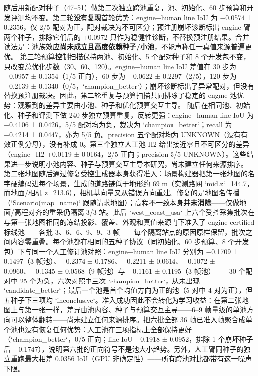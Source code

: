 \documentclass[journal]{IEEEtran}
\begin{document}
随后用新配对种子（47--51）做第二次独立跨池重复，池、初始化、60 步预算和开发评测均不变。第二轮\textbf{没有复现}首轮优势：engine−human line IoU 为 −0.0574 ± 0.2356，仅 2/5 配对为正，配对裁决为不可区分；预注册崩坏诊断标出 engine 臂两个种子，排除它们后的 +0.0972 只作为稳健性诊断，不替换预注册结果。合并读法是：池族效应\textbf{尚未成立且高度依赖种子/小池}，不能声称任一真值来源普遍更优。
第三轮预算控制扫描保持两池、初始化、5 个配对种子和 8 个开发包不变，只改变总优化步数（30、60、120）。engine−human line IoU 差值在 30 步为 −0.0957 ± 0.1354（1/5 正向），60 步为 −0.0622 ± 0.2297（2/5），120 步为 −0.2139 ± 0.1340（0/5，`champion_better`）；崩坏诊断标出了异常配对，但没有替换预注册裁决。因此，第二轮重复与预算扫描共同排除了稳定的 engine 池优势：观察到的差异主要由小池、种子和优化预算交互主导。
随后在相同池、初始化、种子和评测下做 240 步独立预算重复，反转更强：engine−human line IoU 为 −0.4106 ± 0.0426，5/5 配对均为负，裁决为 `champion_better`；recall 为 −0.4214 ± 0.0447，亦为 5/5 负。precision 五个配对均为 UNKNOWN（没有有效正例分母），没有补成 0。第三个独立人工池 H2 给出接近零且不可区分的差异（engine−H2 +0.0119 ± 0.0164，2/5 正向；precision 5/5 UNKNOWN）。这些结果进一步说明小池内容、种子与预算交互主导本研究，尚未建立任何来源排序。
第二张地图随后通过修复受控生成器本身获得准入：场景构建器把第一张地图的名字硬编码进每个场景，生成的道路链低于地形约 69 m（实测路网 `mid.z`=144.7，而地面/相机 z=213.6），相机基向量又从错误方向重建。修复的是地图名传播（`Scenario(map_name)` 跟随请求地图）；高程不一致本身\textbf{并未消除}------仅做地面/高程对齐的重采仍隔离 3/3 站。此后 `west_coast_usa` 上六个受控采集批次在与第一张地图相同的冻结投影、覆盖、外观和真值来源门下准入了 engine-certified 标线池------各批 3、6、6、9、9、3 帧------每个隔离站点的原因原样保留，批次之间内容零重叠。每个池都在相同的五种子协议（同初始化、60 步预算、8 个开发包）下与同一个人工修订池对照：engine−human line IoU 分别为 −0.1709 ± 0.1497（3 帧池）、−0.2374 ± 0.1786、−0.2211 ± 0.0614、−0.1072 ± 0.0960、−0.1345 ± 0.0568（9 帧池）与 +0.1161 ± 0.1195（3 帧池）------30 个配对中 25 个为负，六次对照中三次 `champion_better`，从未出现 `candidate_better`；最后一个池是首个均值方向为正的池（5 对中 4 对为正），但五种子下三项均 `inconclusive`。准入成功因此不会转化为学习收益：在第二张地图上与第一张一样，差异由池内容、种子与预算交互主导------6--9 帧量级的单池方向可以整体翻转------尚未建立任何来源排序。把六批全部 36 帧已准入帧聚合成单个池也没有恢复任何优势：人工池在三项指标上全部保持更好（`champion_better`，0/5 正向；line IoU −0.1918 ± 0.0952，排除 1 个崩坏种子后 −0.1747），说明第六批的正向符号不是池大小趋势。另外，人工臂同种子的独立重跑最大相差 0.0356 IoU（GPU 非确定性）------所有跨池对比都带有这一噪声下限。
\end{document}
